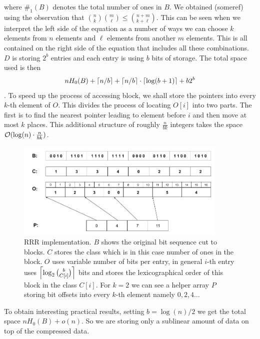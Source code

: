 where $\#_1(B)$ denotes the total number of ones in $B$. We obtained (someref) using the
observation that ${n\choose k} {m\choose \ell} \leq {n+m\choose k+\ell}$. This can be seen
when we interpret the left side of the equation as a number of ways we can choose $k$ elements
from $n$ elements and $\ell$ elements from another $m$ elements. This is all contained on the
right side of the equation that includes all these combinations. $D$ is storing $2^b$ entries
and each entry is using $b$ bits of storage.
The total space used is then $$nH_0(B) + \left\lceil n/b \right\rceil + \left\lceil n/b \right\rceil \cdot \left\lceil \log(b+1) \right\rceil + b2^b$$.
To speed up the process of accessing block, we shall store the pointers into every $k$-th element
of $O$. This divides the process of locating $O[i]$ into two parts. The first is to find the nearest
pointer leading to element before $i$ and then move at most $k$ places. This additional structure of
roughly $\frac{n}{bk}$ integers takes the space $\mathcal{O}(\log(n)\cdot \frac{n}{bk})$.

\begin{figure}
	\centerline{
		\includegraphics[width=0.9\textwidth, height=0.3\textheight]{images/rrr}
	}
	\caption[TODO]{RRR implementation. $B$ shows the original bit sequence cut to
    blocks. $C$ stores the class which is in this case number of ones in the block.
    $O$ uses variable number of bits per entry, in general $i$-th entry uses
    $\left\lceil \log_2{b\choose C[i]} \right\rceil$ bits and stores the lexicographical order
    of this block in the class $C[i]$. For $k=2$ we can see a helper array $P$
    storing bit offsets into every $k$-th element namely $0, 2, 4\ldots$
	}
	\label{obr:RRRFinal}
\end{figure}

To obtain interesting practical results, setting $b=\log(n)/2$ we get the total space
$nH_0(B) + o(n)$. So we are storing only a sublinear amount of data on top of the compressed
data.

